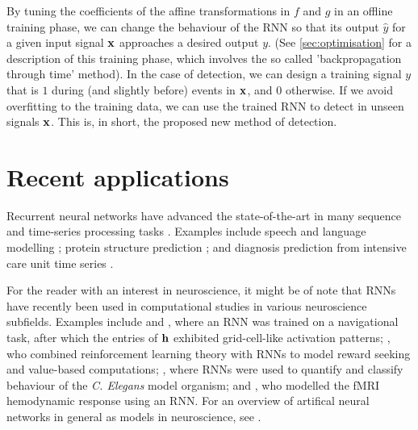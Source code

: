 \documentclass[Master_Thesis.tex]{subfiles}
\begin{document}

By tuning the coefficients of the affine transformations in $f$ and $g$ in an offline training phase, we can change the behaviour of the RNN so that its output $\hat{y}$ for a given input signal $\vb{x}$ approaches a desired output $y$. (See \cref{sec:optimisation} for a description of this training phase, which involves the so called 'backpropagation through time' method). In the case of \swr{} detection, we can design a training signal $y$ that is $1$ during (and slightly before) \swr{} events in $\vb{x}$, and $0$ otherwise. If we avoid overfitting to the training data, we can use the trained RNN to detect \swrs{} in unseen signals $\vb{x}$. This is, in short, the proposed new method of \swr{} detection.

\clearpage


\section{Recent applications}
\label{sec:recent}

Recurrent neural networks have advanced the state-of-the-art in many sequence and time-series processing tasks \cite{Greff2017}. Examples include speech and language modelling \cite{LeCun2015,Goodfellow2016}; protein structure prediction \cite{Sonderby2014}; and diagnosis prediction from intensive care unit time series \cite{Lipton2015}.

For the reader with an interest in neuroscience, it might be of note that RNNs have recently been used in computational studies in various neuroscience subfields. Examples include \cite{Cueva2018} and \cite{Banino2018}, where an RNN was trained on a navigational task, after which the entries of $\vb{h}$ exhibited grid-cell-like\footnotemark{} activation patterns; \cite{Song2017}, who combined reinforcement learning theory with RNNs to model reward seeking and value-based computations; \cite{Li2017}, where RNNs were used to quantify and classify behaviour of the \emph{C. Elegans} model organism; and \cite{Guclu2017}, who modelled the fMRI hemodynamic response using an RNN. For an overview of artifical neural networks in general as models in neuroscience, see \cite{Kriegeskorte2015}.

\end{document}
